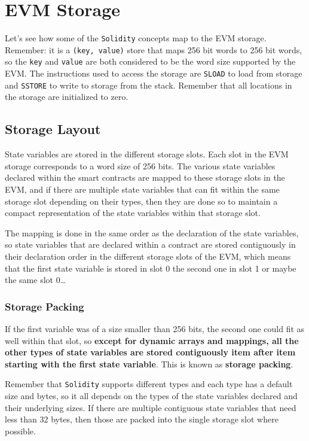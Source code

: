 \section{EVM Storage}\label{evm-storage}

Let's see how some of the \texttt{Solidity} concepts map to the EVM
storage. Remember: it is a \texttt{(key,\ value)} store that maps 256
bit words to 256 bit words, so the \texttt{key} and \texttt{value} are
both considered to be the word size supported by the EVM. The
instructions used to access the storage are \texttt{SLOAD} to load from
storage and \texttt{SSTORE} to write to storage from the stack. Remember
that all locations in the storage are initialized to zero.

\subsection{Storage Layout}\label{storage-layout}

State variables are stored in the different storage slots. Each slot in
the EVM storage corresponds to a word size of 256 bits. The various
state variables declared within the smart contracts are mapped to these
storage slots in the EVM, and if there are multiple state variables that
can fit within the same storage slot depending on their types, then they
are done so to maintain a compact representation of the state variables
within that storage slot.

The mapping is done in the same order as the declaration of the state
variables, so state variables that are declared within a contract are
stored contiguously in their declaration order in the different storage
slots of the EVM, which means that the first state variable is stored in
slot 0 the second one in slot 1 or maybe the same slot 0\ldots{}

\subsubsection{Storage Packing}\label{storage-packing}

If the first variable was of a size smaller than 256 bits, the second
one could fit as well within that slot, so \textbf{except for dynamic
arrays and mappings, all the other types of state variables are stored
contiguously item after item starting with the first state variable}.
This is known as \textbf{storage packing}.

Remember that \texttt{Solidity} supports different types and each type
has a default size and bytes, so it all depends on the types of the
state variables declared and their underlying sizes. If there are
multiple contiguous state variables that need less than 32 bytes, then
those are packed into the single storage slot where possible.

